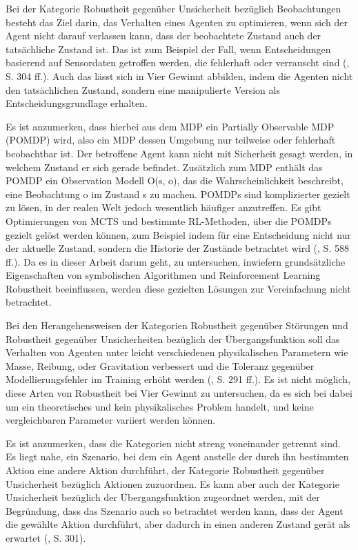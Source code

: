 Bei der Kategorie Robustheit gegenüber Unsicherheit bezüglich Beobachtungen besteht das Ziel darin, das Verhalten eines Agenten zu optimieren, wenn sich der Agent nicht darauf verlassen kann, dass der beobachtete Zustand auch der tatsächliche Zustand ist. Das ist zum Beispiel der Fall, wenn Entscheidungen basierend auf Sensordaten getroffen werden, die fehlerhaft oder verrauscht sind (\cite{Moos.2022}, S. 304 ff.). Auch das lässt sich in Vier Gewinnt abbilden, indem die Agenten nicht den tatsächlichen Zustand, sondern eine manipulierte Version als Entscheidungsgrundlage erhalten.

Es ist anzumerken, dass hierbei aus dem MDP ein Partially Observable MDP (POMDP) wird, also ein MDP dessen Umgebung nur teilweise oder fehlerhaft beobachtbar ist. Der betroffene Agent kann nicht mit Sicherheit gesagt werden, in welchem Zustand er sich gerade befindet. Zusätzlich zum MDP enthält das POMDP ein Observation Modell O(s, o), das die Wahrscheinlichkeit beschreibt, eine Beobachtung o im Zustand s zu machen. POMDPs sind komplizierter gezielt zu lösen, in der realen Welt jedoch wesentlich häufiger anzutreffen. Es gibt Optimierungen von MCTS und bestimmte RL-Methoden, über die POMDPs gezielt gelöst werden können, zum Beispiel indem für eine Entscheidung nicht nur der aktuelle Zustand, sondern die Historie der Zustände betrachtet wird (\cite{Russell.2020}, S. 588 ff.). Da es in dieser Arbeit darum geht, zu untersuchen, inwiefern grundsätzliche Eigenschaften von symbolischen Algorithmen und Reinforcement Learning Robustheit beeinflussen, werden diese gezielten Lösungen zur Vereinfachung nicht betrachtet.

Bei den Herangehensweisen der Kategorien Robustheit gegenüber Störungen und Robustheit gegenüber Unsicherheiten bezüglich der Übergangsfunktion soll das Verhalten von Agenten unter leicht verschiedenen physikalischen Parametern wie Masse, Reibung, oder Gravitation verbessert und die Toleranz gegenüber Modellierungsfehler im Training erhöht werden (\cite{Moos.2022}, S. 291 ff.). Es ist nicht möglich, diese Arten von Robustheit bei Vier Gewinnt zu untersuchen, da es sich bei dabei um ein theoretisches und kein physikalisches Problem handelt, und keine vergleichbaren Parameter variiert werden können.

Es ist anzumerken, dass die Kategorien nicht streng voneinander getrennt sind. Es liegt nahe, ein Szenario, bei dem ein Agent anstelle der durch ihn bestimmten Aktion eine andere Aktion durchführt, der Kategorie Robustheit gegenüber Unsicherheit bezüglich Aktionen zuzuordnen. Es kann aber auch der Kategorie Unsicherheit bezüglich der Übergangsfunktion zugeordnet werden, mit der Begründung, dass das Szenario auch so betrachtet werden kann, dass der Agent die gewählte Aktion durchführt, aber dadurch in einen anderen Zustand gerät als erwartet (\cite{Moos.2022}, S. 301).

